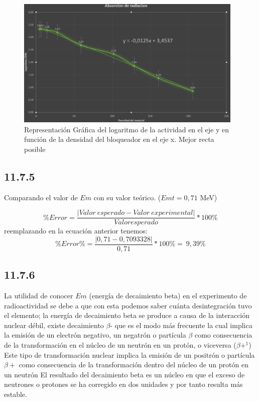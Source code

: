 \documentclass{article}									%
\begin{document}
\begin{figure}[H]
  \centering
     \includegraphics[width=0.97\textwidth]{absorcion}
  \caption{Representación Gráfica del logaritmo de la actividad en el eje y en función de la densidad del bloqueador en el eje x. Mejor recta posible}
      \label{fig:absorcion}
\end{figure}

\subsection{11.7.5}
Comparando el valor de $Em$ con su valor teórico. ($Emt = 0, 71$ MeV)

\begin{equation}
    \% Error = \frac{|Valor \ esperado-Valor \ experimental|}{Valor esperado}*100\%
\end{equation}
reemplazando en la ecuación anterior tenemos: 
\begin{equation}
    \% Error \% = \frac{|0,71-0,7093328|}{0,71}*100\% = \ 9,39\%
\end{equation}

\subsection{11.7.6}
La utilidad de conocer $Em$ (energía de decaimiento beta) en el experimento de radioactividad  se debe a que con esta podemos saber cuánta desintegración tuvo el elemento; la energía de decaimiento beta se produce a causa de la interacción nuclear débil, existe decaimiento $\beta$- que es el modo más frecuente  la cual implica la emisión de un electrón negativo, un negatrón o partícula $\beta$ como consecuencia de la transformación en el núcleo de un neutrón en un protón, o viceversa ($\beta+^{1}$)  Este tipo de transformación nuclear implica la emisión de un positrón o partícula$\beta+$ como consecuencia de la transformación dentro del núcleo de un protón en un neutrón El resultado del decaimiento beta es un núcleo en que el exceso de neutrones o protones se ha corregido en dos unidades y por tanto resulta más estable.\\
\end{document}
